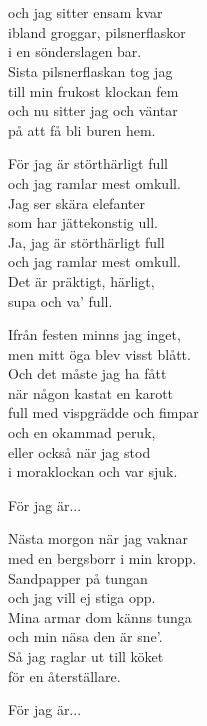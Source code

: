 {{\newpage

 \\       

\\
och jag sitter ensam kvar\\
ibland groggar, pilsnerflaskor\\
i en sönderslagen bar.\\
Sista pilsnerflaskan tog jag\\
till min frukost klockan fem\\
och nu sitter jag och väntar\\
på att få bli buren hem.

För jag är störthärligt full\\
och jag ramlar mest omkull.\\
Jag ser skära elefanter\\
som har jättekonstig ull.\\
Ja, jag är störthärligt full\\
och jag ramlar mest omkull.\\
Det är präktigt, härligt,\\
supa och va' full.

Ifrån festen minns jag inget,\\
men mitt öga blev visst blått.\\
Och det måste jag ha fått\\
när någon kastat en karott\\
full med vispgrädde och fimpar\\
och en okammad peruk,\\
eller också när jag stod\\
i moraklockan och var sjuk.

För jag är...

Nästa morgon när jag vaknar\\
med en bergsborr i min kropp.\\
Sandpapper på tungan\\
och jag vill ej stiga opp.\\
Mina armar dom känns tunga\\
och min näsa den är sne'.\\
Så jag raglar ut till köket\\
för en återställare.

För jag är...\\

}}
